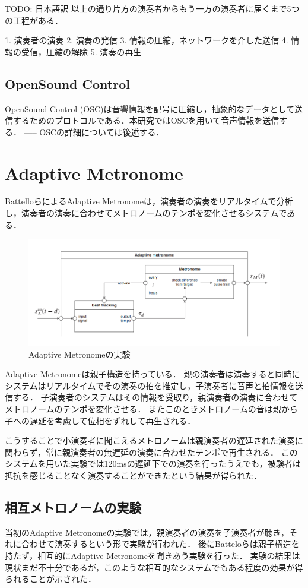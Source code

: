 TODO: 日本語訳
以上の通り片方の演奏者からもう一方の演奏者に届くまで5つの工程がある．

1. 演奏者の演奏
2. 演奏の発信
3. 情報の圧縮，ネットワークを介した送信
4. 情報の受信，圧縮の解除
5. 演奏の再生

\subsection{OpenSound Control}
OpenSound Control (OSC)は音響情報を記号に圧縮し，抽象的なデータとして送信するためのプロトコルである．本研究ではOSCを用いて音声情報を送信する．
----- OSCの詳細については後述する．

\section{Adaptive Metronome}
BattelloらによるAdaptive Metronome\cite{admet}\cite{admet:experiment}は，演奏者の演奏をリアルタイムで分析し，演奏者の演奏に合わせてメトロノームのテンポを変化させるシステムである．

\begin{figure}[htbp]
  \centering
  \includegraphics[width=0.8\linewidth]{src/admet.png}
  \caption{Adaptive Metronomeの実験\cite{admet}}
  \label{fig:admet}
\end{figure}

Adaptive Metronomeは親子構造を持っている．
親の演奏者は演奏すると同時にシステムはリアルタイムでその演奏の拍を推定し，子演奏者に音声と拍情報を送信する．
子演奏者のシステムはその情報を受取り，親演奏者の演奏に合わせてメトロノームのテンポを変化させる．
またこのときメトロノームの音は親から子への遅延を考慮して位相をずれして再生される．

こうすることで小演奏者に聞こえるメトロノームは親演奏者の遅延された演奏に関わらず，常に親演奏者の無遅延の演奏に合わせたテンポで再生される．
このシステムを用いた実験では120msの遅延下での演奏を行ったうえでも，被験者は抵抗を感じることなく演奏することができたという結果が得られた．\cite{admet}

\subsection{相互メトロノームの実験}
当初のAdaptive Metronomeの実験では，親演奏者の演奏を子演奏者が聴き，それに合わせて演奏するという形で実験が行われた．
後にBatteloらは親子構造を持たず，相互的にAdaptive Metronomeを聞きあう実験を行った．
実験の結果は現状まだ不十分であるが，このような相互的なシステムでもある程度の効果が得られることが示された．

